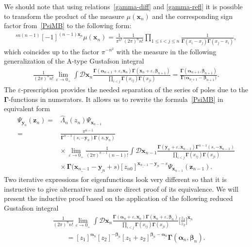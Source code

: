 \documentclass[10pt,a4paper]{amsart}
\numberwithin{equation}{section}
\begin{document}
We should note that using relations~\eqref{gamma-diff} and
\eqref{gamma-refl} it is possible to transform the
product of the measure $\mu(\bm{x}_{n})$ and the corresponding
sign factor from~\eqref{PsiMB} to the following form:
\begin{align*}
[-1]^{sn(n-1)} [-1]^{(n-1)\underline{\bm{x}_{n}}}
\mu(\bm{x}_{n}) = \frac{1}{\pi^{n^2}}
\frac{1}{(2\pi)^n n!}
\prod\limits_{1\leq i<j\leq n}
\frac{1}{\mathbf{\Gamma}(x_i-x_j)\mathbf{\Gamma}(x_j-x_i)},
\end{align*}
which coincides up to the factor $\pi^{-n^2}$ with the measure in the following generalization \cite{DM,DM3,DMV2,DMV1,MN,N,SS0,SS1,SS2} of the A-type Gustafson integral \cite{G2,G1,G3}
\begin{align*}
\frac{1}{(2\pi)^n n!}
\lim\limits_{\varepsilon\to 0_+}
\int \mathcal{D}\bm{x}_{n}
\frac{\mathbf{\Gamma}(\bm \alpha_{n+1}+\varepsilon,\bm x_{n})
\mathbf{\Gamma}(\bm x_{n}+\varepsilon,\bm \beta_{n+1})}
{\prod\limits_{i<j}
\mathbf{\Gamma}(x_{ij})\mathbf{\Gamma}(x_{ji})} =
\frac{\mathbf{\Gamma}(\bm \alpha_{n+1},\bm \beta_{n+1})}
{\mathbf{\Gamma}\bigl(\underline{\bm \alpha_{n+1}}-\underline{\bm \beta_{n+1}}\bigr)} .
\end{align*}
The $\varepsilon$-prescription provides the needed separation of the series
of poles due to the $\mathbf{\Gamma}$-functions in numerators.
It allows us to rewrite the formula~\eqref{PsiMB} in equivalent form
\begin{align*}
\Psi_{\bm{y}_{n}}(\bm{z}_{n}) ={}& \hat{\Lambda}_n(z_n) \Psi_{\bm{x}_{n-1}} \\
={}&
\frac{\pi^{n-1}}{\mathbf{\Gamma}^{n-1}(s ,-\bm{y}_{n})
\mathbf{\Gamma}(s ,\bm{y}_{n})} \\
&{\times}\,
\lim\limits_{\varepsilon\to 0_+} \frac{1}{(2\pi)^{n-1} (n-1)!}
\int \mathcal{D}\bm{x}_{n-1}
\frac{\mathbf{\Gamma}(\bm y_{n}+\varepsilon,\bm x_{n-1})
\mathbf{\Gamma}^{n-1}(s ,-\bm{x}_{n-1})}
{\prod\limits_{i<j}\mathbf{\Gamma}(x_{ij})\mathbf{\Gamma}(x_{ji})} \\
&{\times}\,
\mathbf{\Gamma}\bigl(\underline{\bm{x}_{n-1}}-\underline{\bm{y}_{n}}+s\bigr)
[z_{n 0}]^{\underline{\bm{x}_{n-1}}-\underline{\bm{y}_{n}}-s}
\Psi_{\bm{x}_{n-1}}(\bm{z}_{n-1}) .
\end{align*}
Two iterative expressions for eigenfunctions look very different
so that it is instructive to give alternative and more direct proof of its equivalence.
We will present the inductive proof based on the application
of the following reduced Gustafson integral \cite{M}
\begin{align}
& \nonumber
\frac{1}{(2\pi)^n n!}
\lim\limits_{\varepsilon\to 0_+}
\int \mathcal{D}\bm{x}_{n}
\frac{\mathbf{\Gamma}(\bm \alpha_{n}+\varepsilon,\bm x_{n})
\mathbf{\Gamma}(\bm x_{n}+\varepsilon,\bm \beta_{n})}
{\prod\limits_{i<j}
\mathbf{\Gamma}(x_{ij})\mathbf{\Gamma}(x_{ji})}
\biggl[\frac{z_1}{z_2}\biggr]^{\underline{\bm x_{n}}} \\
\label{gus1}
& \qquad =
[z_1]^{\underline{\bm \alpha_{n}}} [z_2]^{-\underline{\bm \beta_{n}}}
[z_1+z_2]^{\underline{\bm \beta_{n}}-\underline{\bm \alpha_{n}}}
\mathbf{\Gamma}(\bm \alpha_{n},\bm \beta_{n}) .
\end{align}
\end{document}
